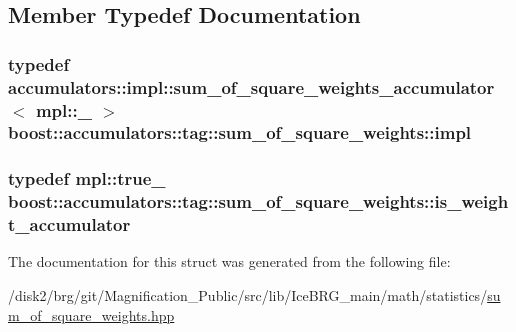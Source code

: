 \subsection{Member Typedef Documentation}
\hypertarget{structboost_1_1accumulators_1_1tag_1_1sum__of__square__weights_a1b17755b77e02ad2286bcace0dcb9109}{
\subsubsection[{impl}]{\setlength{\rightskip}{0pt plus 5cm}typedef {\bf accumulators\-::impl\-::sum\-\_\-of\-\_\-square\-\_\-weights\-\_\-accumulator}$<$ mpl\-::\-\_ $>$ {\bf boost\-::accumulators\-::tag\-::sum\-\_\-of\-\_\-square\-\_\-weights\-::impl}}}\label{structboost_1_1accumulators_1_1tag_1_1sum__of__square__weights_a1b17755b77e02ad2286bcace0dcb9109}
\hypertarget{structboost_1_1accumulators_1_1tag_1_1sum__of__square__weights_aa1b4145dd1d30517a31fc2b139a4d831}{
\subsubsection[{is\-\_\-weight\-\_\-accumulator}]{\setlength{\rightskip}{0pt plus 5cm}typedef mpl\-::true\-\_\- {\bf boost\-::accumulators\-::tag\-::sum\-\_\-of\-\_\-square\-\_\-weights\-::is\-\_\-weight\-\_\-accumulator}}}\label{structboost_1_1accumulators_1_1tag_1_1sum__of__square__weights_aa1b4145dd1d30517a31fc2b139a4d831}


The documentation for this struct was generated from the following file\-:\begin{DoxyCompactItemize}
\item 
/disk2/brg/git/\-Magnification\-\_\-\-Public/src/lib/\-Ice\-B\-R\-G\-\_\-main/math/statistics/\hyperlink{sum__of__square__weights_8hpp}{sum\-\_\-of\-\_\-square\-\_\-weights.\-hpp}\end{DoxyCompactItemize}
